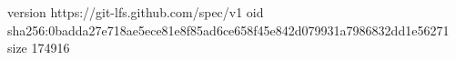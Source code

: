 version https://git-lfs.github.com/spec/v1
oid sha256:0badda27e718ae5ece81e8f85ad6ce658f45e842d079931a7986832dd1e56271
size 174916
